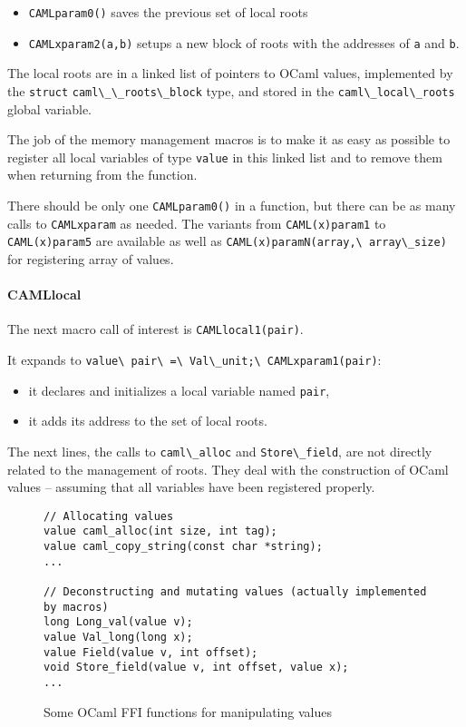 \documentclass[a4paper]{easychair}
\newcommand{\cpp}[1]{\lstinline[style=C++]{#1}}
\begin{document}
\begin{itemize}
  \item \cpp{CAMLparam0()} saves the previous set of local roots 
  \item \cpp{CAMLxparam2(a,b)} setups a new block of roots with the
      addresses of \cpp{a} and \cpp{b}.
\end{itemize}

The local roots are in a linked list of pointers to OCaml values,
implemented by the \cpp{struct} \cpp{caml\_\_roots\_block} type, and
stored in the \cpp{caml\_local\_roots} global variable.

The job of the memory management macros is to make it as easy as
possible to register all local variables of type \cpp{value} in this
linked list and to remove them when returning from the function.

There should be only one \cpp{CAMLparam0()} in a function, but there
can be as many calls to \cpp{CAMLxparam} as needed. The variants from
\cpp{CAML(x)param1} to \cpp{CAML(x)param5} are available as well as
\cpp{CAML(x)paramN(array,\ array\_size)} for registering array of values.

\paragraph{CAMLlocal} The next macro call of interest is
\cpp{CAMLlocal1(pair)}. 

It expands to \cpp{value\ pair\ =\ Val\_unit;\ CAMLxparam1(pair)}:
%
\begin{itemize}
\item it declares and initializes a local variable named \cpp{pair},
\item it adds its address to the set of local roots.
\end{itemize}

The next lines, the calls to \cpp{caml\_alloc} and
\cpp{Store\_field}, are not directly related to the management of
roots. They deal with the construction of OCaml values -- assuming that
all variables have been registered properly.

\begin{figure}[htbp]
\begin{lstlisting}[style=C++]
// Allocating values
value caml_alloc(int size, int tag);
value caml_copy_string(const char *string);
...
    
// Deconstructing and mutating values (actually implemented by macros)
long Long_val(value v);
value Val_long(long x);
value Field(value v, int offset); 
void Store_field(value v, int offset, value x);
...
\end{lstlisting}
  \caption{Some OCaml FFI functions for manipulating values}
  \label{fig:mlvalue}
\end{figure}
\end{document}
